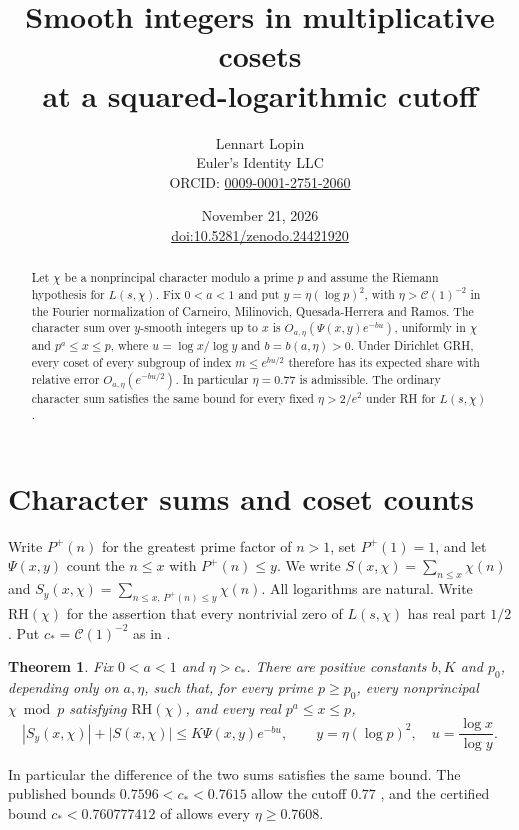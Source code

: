 \documentclass[11pt]{article}
\title{Smooth integers in multiplicative cosets\\at a squared-logarithmic cutoff}
\author{Lennart Lopin\\ {\normalsize Euler's Identity LLC}\\ {\normalsize ORCID: \href{https://orcid.org/0009-0001-2751-2060}{0009-0001-2751-2060}}}
\date{November 21, 2026\\ {\small \href{https://doi.org/10.5281/zenodo.24421920}{doi:10.5281/zenodo.24421920}}}
\newtheorem{theorem}{Theorem}
\newcommand{\cstar}{c_*}
\begin{document}
\maketitle
\begin{abstract}
Let \(\chi\) be a nonprincipal character modulo a prime \(p\) and assume
the Riemann hypothesis for \(L(s,\chi)\). Fix \(0<a<1\) and put
\(y=\eta(\log p)^2\), with \(\eta>\mathcal C(1)^{-2}\) in the
Fourier normalization of Carneiro, Milinovich, Quesada-Herrera and Ramos.
The character sum over \(y\)-smooth integers up to \(x\) is
\(O_{a,\eta}(\Psi(x,y)e^{-bu})\), uniformly in \(\chi\) and
\(p^a\le x\le p\), where \(u=\log x/\log y\) and \(b=b(a,\eta)>0\).
Under Dirichlet GRH, every coset of every subgroup of index
\(m\le e^{bu/2}\) therefore has its expected share with relative error
\(O_{a,\eta}(e^{-bu/2})\). In particular \(\eta=0.77\) is admissible.
The ordinary character sum satisfies the same bound for every fixed
\(\eta>2/e^2\) under RH for \(L(s,\chi)\).
\end{abstract}

\section{Character sums and coset counts}
Write \(P^+(n)\) for the greatest prime factor of \(n>1\), set \(P^+(1)=1\),
and let \(\Psi(x,y)\) count the \(n\le x\) with \(P^+(n)\le y\).
We write \(S(x,\chi)=\sum_{n\le x}\chi(n)\) and
\(S_y(x,\chi)=\sum_{n\le x,\,P^+(n)\le y}\chi(n)\).
All logarithms are natural. Write \(\mathrm{RH}(\chi)\) for the assertion
that every nontrivial zero of \(L(s,\chi)\) has real part \(1/2\). Put
\(\cstar=\mathcal C(1)^{-2}\) as in \cite[(1.1)]{cmqr}.

\begin{theorem}\label{th:main}
Fix \(0<a<1\) and \(\eta>\cstar\). There are positive constants \(b,K\)
and \(p_0\), depending only on \(a,\eta\), such that, for every prime
\(p\ge p_0\), every nonprincipal \(\chi\bmod p\) satisfying
\(\mathrm{RH}(\chi)\), and every real
\(p^a\le x\le p\),
\begin{equation}\label{eq:main}
 |S_y(x,\chi)|+|S(x,\chi)|\le K\Psi(x,y)e^{-bu},
 \qquad y=\eta(\log p)^2,\quad u=\frac{\log x}{\log y}.
\end{equation}
\end{theorem}
In particular the difference of the two sums satisfies the same bound.
The published bounds \(0.7596<\cstar<0.7615\) allow the cutoff \(0.77\)
\cite[Theorems 1 and 5]{cmqr}, and the certified bound
\(\cstar<0.760777412\) of \cite{lopin} allows every \(\eta\ge0.7608\).
\end{document}
